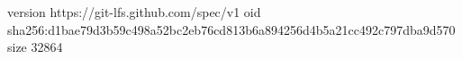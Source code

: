 version https://git-lfs.github.com/spec/v1
oid sha256:d1bae79d3b59c498a52bc2eb76cd813b6a894256d4b5a21cc492c797dba9d570
size 32864
